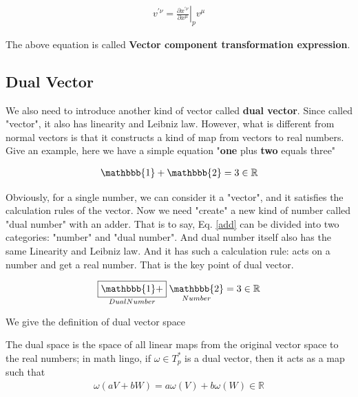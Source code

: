 \begin{align}
    v^{\prime \nu}=\left.\frac{\partial x^{\prime \nu}}{\partial x^{\mu}}\right|_{p}v^{\mu}
\end{align}

The above equation is called \textbf{Vector component transformation expression}.

\subsection{Dual Vector}


We also need to introduce another kind of vector called \textbf{dual vector}. Since called "vector", it also has linearity and Leibniz law. However, what is different from normal vectors is that it constructs a kind of map from vectors to real numbers. Give an example, here we have a simple equation "\textbf{one} plus \textbf{two} equals three"

\begin{align}
    \mathbbb{1}+\mathbbb{2}=3\in \mathbb{R}\label{add}
\end{align}

Obviously, for a single number, we can consider it a "vector", and it satisfies the calculation rules of the vector. Now we need "create" a new kind of number called "dual number" with an adder. That is to say, Eq. \ref{add} can be divided into two categories: "number" and "dual number". And dual number itself also has the same Linearity and Leibniz law. And it has such a calculation rule: acts on a number and get a real number. That is the key point of dual vector.

\begin{align}
    \underset{Dual Number}{\boxed{\mathbbb{1}+}}\;\underset{Number}{\mathbbb{2}}=3\in \mathbb{R}
\end{align}

We give the definition of dual vector space 

\begin{tcolorbox}[title=\textbf{Dual Vector Space},colback=SeaGreen!10!CornflowerBlue!10,colframe=RoyalPurple!55!Aquamarine!100!]
    The dual space is the space of all linear maps from the original vector space to the real numbers; in math lingo, if $\omega\in T_{p}^*$  is a dual vector, then it acts as a map such that
    \begin{align}
        \omega(aV+bW)=a\omega (V)+b\omega (W)\in \mathbb{R}\label{def:dual}
    \end{align}
\end{tcolorbox}

